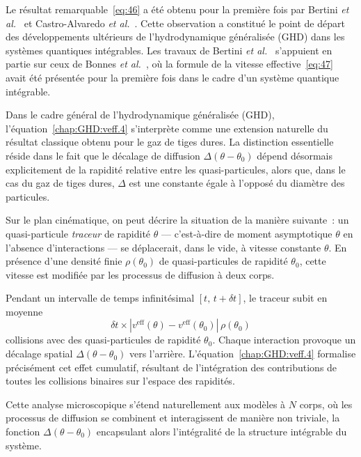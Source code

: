 \medskip

Le résultat remarquable~\eqref{eq:46} a été obtenu pour la première fois par Bertini \emph{et al.}~\cite{Bertini2016} et Castro-Alvaredo \emph{et al.}~\cite{CastroAlvaredo2016}. Cette observation a constitué le point de départ des développements ultérieurs de l’hydrodynamique généralisée (GHD) dans les systèmes quantiques intégrables. Les travaux de Bertini \emph{et al.}~\cite{Bertini2016} s’appuient en partie sur ceux de Bonnes \emph{et al.}~\cite{Bonnes2014}, où la formule de la vitesse effective~\eqref{eq:47} avait été présentée pour la première fois dans le cadre d’un système quantique intégrable.

\medskip


Dans le cadre général de l’hydrodynamique généralisée (GHD), l’équation~\eqref{chap:GHD:veff.4} s’interprète comme une extension naturelle du résultat classique obtenu pour le gaz de tiges dures. La distinction essentielle réside dans le fait que le décalage de diffusion \(\Delta(\theta - \theta_0)\) dépend désormais explicitement de la rapidité relative entre les quasi-particules, alors que, dans le cas du gaz de tiges dures, \(\Delta\) est une constante égale à l’opposé du diamètre des particules.

\medskip


Sur le plan cinématique, on peut décrire la situation de la manière suivante~: un quasi-particule \emph{traceur} de rapidité \(\theta\) --- c’est-à-dire de moment asymptotique \(\theta\) en l’absence d’interactions --- se déplacerait, dans le vide, à vitesse constante \( \theta \). En présence d’une densité finie \(\rho(\theta_0)\) de quasi-particules de rapidité \(\theta_0\), cette vitesse est modifiée par les processus de diffusion à deux corps.

\medskip


Pendant un intervalle de temps infinitésimal \([t,\, t + \delta t]\), le traceur subit en moyenne
\[
\delta t \times \left| v^{\mathrm{eff}}(\theta) - v^{\mathrm{eff}}(\theta_0) \right| \, \rho(\theta_0)
\]
collisions avec des quasi-particules de rapidité \(\theta_0\). Chaque interaction provoque un décalage spatial \(\Delta(\theta - \theta_0)\) vers l’arrière. L’équation~\eqref{chap:GHD:veff.4} formalise précisément cet effet cumulatif, résultant de l’intégration des contributions de toutes les collisions binaires sur l’espace des rapidités.

Cette analyse microscopique s’étend naturellement aux modèles à \(N\) corps, où les processus de diffusion se combinent et interagissent de manière non triviale, la fonction \(\Delta(\theta - \theta_0)\) encapsulant alors l’intégralité de la structure intégrable du système.


